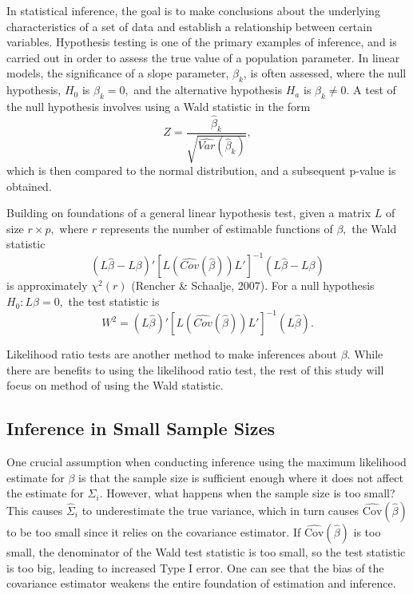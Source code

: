 \documentclass[12pt, twoside]{amherstthesis}
\begin{document}
In statistical inference, the goal is to make conclusions about the underlying characteristics of a set of data and establish a relationship between certain variables. Hypothesis testing is one of the primary examples of inference, and is carried out in order to assess the true value of a population parameter. In linear models, the significance of a slope parameter, \(\beta_k\), is often assessed, where the null hypothesis, \(H_0\) is \(\beta_k = 0,\) and the alternative hypothesis \(H_a\) is \(\beta_k \neq 0.\) A test of the null hypothesis involves using a Wald statistic in the form \[Z = \frac{\hat\beta_k}{\sqrt{\widehat{Var}(\hat\beta_k)}},\] which is then compared to the normal distribution, and a subsequent p-value is obtained.

Building on foundations of a general linear hypothesis test, given a matrix \(L\) of size \(r \times p,\) where \(r\) represents the number of estimable functions of \(\beta,\) the Wald statistic \[(L\hat\beta-L\beta)'[L(\widehat{Cov}(\hat\beta))L']^{-1}(L\hat\beta-L\beta)\] is approximately \(\chi^2(r)\) (Rencher \& Schaalje, 2007). For a null hypothesis \(H_0: L\beta = 0,\) the test statistic is \[W^2 =(L\hat\beta)'[L(\widehat {Cov}(\hat\beta))L']^{-1}(L\hat\beta).\]

Likelihood ratio tests are another method to make inferences about \(\beta\). While there are benefits to using the likelihood ratio test, the rest of this study will focus on method of using the Wald statistic.

\hypertarget{inference-in-small-sample-sizes}{%
\subsection{Inference in Small Sample Sizes}\label{inference-in-small-sample-sizes}}

One crucial assumption when conducting inference using the maximum likelihood estimate for \(\beta\) is that the sample size is sufficient enough where it does not affect the estimate for \(\Sigma_i.\) However, what happens when the sample size is too small? This causes \(\hat\Sigma_i\) to underestimate the true variance, which in turn causes \(\widehat {\text{Cov}}(\hat\beta)\) to be too small since it relies on the covariance estimator. If \(\widehat {\text{Cov}}(\hat\beta)\) is too small, the denominator of the Wald test statistic is too small, so the test statistic is too big, leading to increased Type I error. One can see that the bias of the covariance estimator weakens the entire foundation of estimation and inference.
\end{document}
